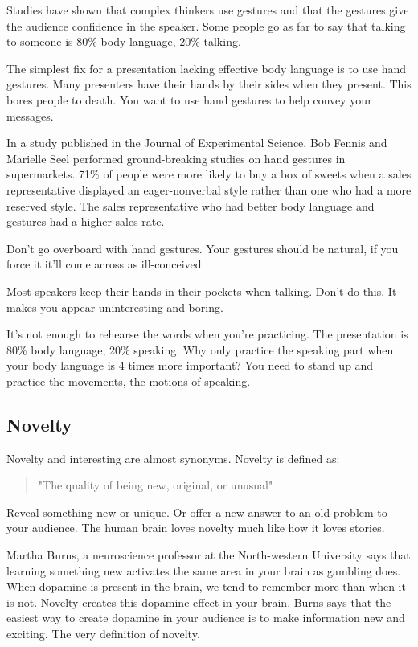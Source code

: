 \documentclass{article}
\begin{document}
Studies have shown that complex thinkers use gestures and that the
gestures give the audience confidence in the speaker. Some people go as
far to say that talking to someone is 80\% body language, 20\% talking.

The simplest fix for a presentation lacking effective body language is
to use hand gestures. Many presenters have their hands by their sides
when they present. This bores people to death. You want to use hand
gestures to help convey your messages.

In a study published in the Journal of Experimental Science, Bob Fennis
and Marielle Seel performed ground-breaking studies on hand gestures in
supermarkets. 71\% of people were more likely to buy a box of sweets
when a sales representative displayed an eager-nonverbal style rather
than one who had a more reserved style. The sales representative who had
better body language and gestures had a higher sales rate.

Don't go overboard with hand gestures. Your gestures should be natural,
if you force it it'll come across as ill-conceived.

Most speakers keep their hands in their pockets when talking. Don't do
this. It makes you appear uninteresting and boring.

It's not enough to rehearse the words when you're practicing. The
presentation is 80\% body language, 20\% speaking. Why only practice the
speaking part when your body language is 4 times more important? You
need to stand up and practice the movements, the motions of speaking.
\subsection{Novelty}
Novelty and interesting are almost synonyms. Novelty is defined as:
\begin{quote}
    "The quality of being new, original, or unusual"
\end{quote}
Reveal something new or unique. Or offer a new answer to an old problem
to your audience. The human brain loves novelty much like how it loves
stories.

Martha Burns, a neuroscience professor at the North-western University
says that learning something new activates the same area in your brain
as gambling does. When dopamine is present in the brain, we tend to
remember more than when it is not. Novelty creates this dopamine effect
in your brain. Burns says that the easiest way to create dopamine in
your audience is to make information new and exciting. The very
definition of novelty.
\end{document}

